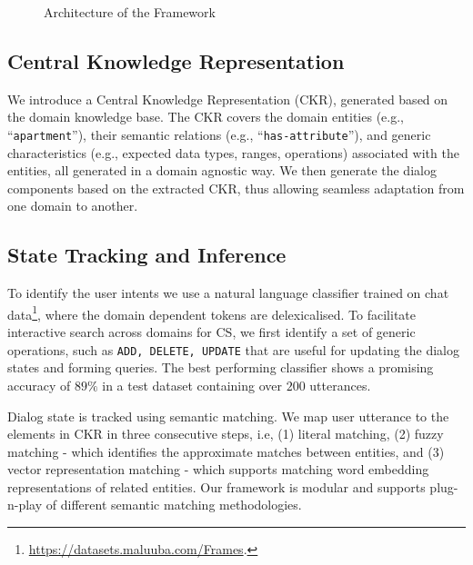 \documentclass[letterpaper]{article} %
\begin{document}
\begin{figure}[!ht]
\centering
{}
\caption{Architecture of the Framework}
\label{fig:system}
\end{figure}


\subsection{Central Knowledge Representation}
We introduce a Central Knowledge Representation (CKR), generated based on the domain knowledge base.
\vspace{-0.84mm}
\vspace{-2.75mm}
The CKR covers the domain entities (e.g., ``\texttt{apartment}''), their semantic relations (e.g., ``\texttt{has-attribute}''),
and generic characteristics (e.g., expected data types, ranges, operations) associated with the entities, all generated in a domain agnostic way. We then generate the dialog components based on the extracted CKR, thus allowing seamless adaptation from one domain to another.

\vspace{-2.43mm}
\subsection{State Tracking and Inference}
To identify the user intents we use a natural language classifier \cite{yang2016hierarchical} trained on chat data\footnote{ \url{https://datasets.maluuba.com/Frames}.}, where the domain dependent tokens are delexicalised. To facilitate interactive search across domains for CS, we first identify a set of generic operations, such as {\texttt{ADD, DELETE, UPDATE}} that are useful for updating the dialog states and forming queries.
The best performing classifier shows a promising accuracy of $89\%$ in a test dataset containing over $200$ utterances. %

Dialog state is tracked using semantic matching. We map user utterance to the elements in CKR in three consecutive steps, i.e, (1) literal matching, (2) fuzzy matching - which identifies the approximate matches between entities, and (3) vector representation matching - which supports matching word embedding representations of related entities.
Our framework is modular and supports plug-n-play of different semantic matching methodologies.
\end{document}
